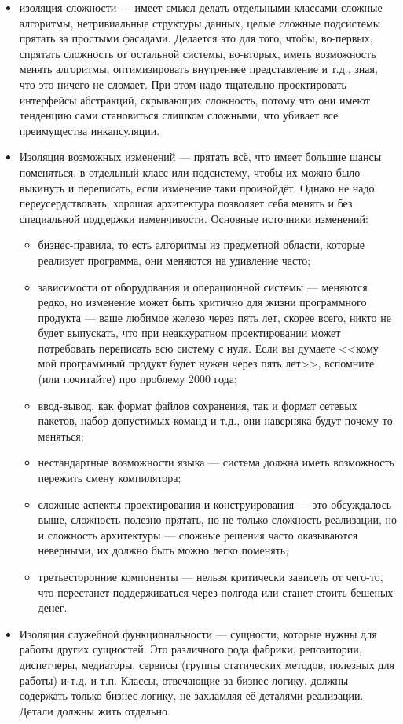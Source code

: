 \documentclass{../text-style}
\begin{document}
\begin{itemize}
    \item изоляция сложности --- имеет смысл делать отдельными классами сложные алгоритмы, нетривиальные структуры данных, целые сложные подсистемы прятать за простыми фасадами. Делается это для того, чтобы, во-первых, спрятать сложность от остальной системы, во-вторых, иметь возможность менять алгоритмы, оптимизировать внутреннее представление и т.д., зная, что это ничего не сломает. При этом надо тщательно проектировать интерфейсы абстракций, скрывающих сложность, потому что они имеют тенденцию сами становиться слишком сложными, что убивает все преимущества инкапсуляции.
    \item Изоляция возможных изменений --- прятать всё, что имеет большие шансы поменяться, в отдельный класс или подсистему, чтобы их можно было выкинуть и переписать, если изменение таки произойдёт. Однако не надо переусердствовать, хорошая архитектура позволяет себя менять и без специальной поддержки изменчивости. Основные источники изменений:
    \begin{itemize}
        \item бизнес-правила, то есть алгоритмы из предметной области, которые реализует программа, они меняются на удивление часто;
        \item зависимости от оборудования и операционной системы --- меняются редко, но изменение может быть критично для жизни программного продукта --- ваше любимое железо через пять лет, скорее всего, никто не будет выпускать, что при неаккуратном проектировании может потребовать переписать всю систему с нуля. Если вы думаете <<кому мой программный продукт будет нужен через пять лет>>, вспомните (или почитайте) про проблему 2000 года;
        \item ввод-вывод, как формат файлов сохранения, так и формат сетевых пакетов, набор допустимых команд и т.д., они наверняка будут почему-то меняться;
        \item нестандартные возможности языка --- система должна иметь возможность пережить смену компилятора;
        \item сложные аспекты проектирования и конструирования --- это обсуждалось выше, сложность полезно прятать, но не только сложность реализации, но и сложность архитектуры --- сложные решения часто оказываются неверными, их должно быть можно легко поменять;
        \item третьесторонние компоненты --- нельзя критически зависеть от чего-то, что перестанет поддерживаться через полгода или станет стоить бешеных денег.
    \end{itemize}
    \item Изоляция служебной функциональности --- сущности, которые нужны для работы других сущностей. Это различного рода фабрики, репозитории, диспетчеры, медиаторы, сервисы (группы статических методов, полезных для работы) и т.д. и т.п. Классы, отвечающие за бизнес-логику, должны содержать только бизнес-логику, не захламляя её деталями реализации. Детали должны жить отдельно.
\end{itemize}
\end{document}
